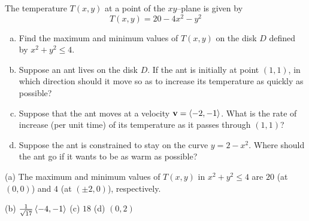 \begin{question}[M200 2009D] %
The temperature $T(x,y)$ at a point of the $xy$--plane is given by
\begin{equation*}
T(x,y) = 20 - 4x^2 - y^2 
\end{equation*}
\begin{enumerate}[(a)]
\item
Find the maximum and minimum values of $T(x,y)$ on the disk $D$ 
defined by $x^2 + y^2 \le 4$.

\item
Suppose an ant lives on the disk $D$. If the ant is initially at point 
$(1, 1)$, in which direction should it move so as to increase its 
temperature as quickly as possible?


\item
Suppose that the ant moves at a velocity $\mathbf{v} = \left< -2, -1\right>$. 
What is the rate of increase (per unit time) of its temperature as it passes 
through $(1, 1)$?

\item 
Suppose the ant is constrained to stay on the curve $y = 2 - x^2$. 
Where should the ant go if it wants to be as warm as possible?

\end{enumerate}
\end{question}

%

\begin{answer}
(a) The maximum and minimum values of $T(x,y)$ in $x^2+y^2\le 4$
     are $20$ (at $(0,0)$) and  $4$ (at $(\pm 2,0)$), respectively.

(b) $\frac{1}{\sqrt{17}}\left< -4,-1\right>$\qquad
(c) $18$\qquad
(d) $(0,2)$
\end{answer}

